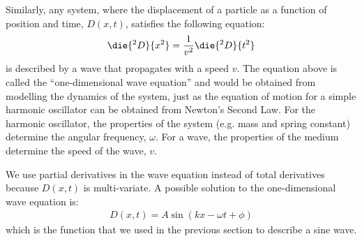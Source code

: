 Similarly, any system, where the displacement of a particle as a function of position and time, $D(x,t)$, satisfies the following equation:
\begin{align}
\die{^2D}{x^2}=\frac{1}{v^2}\die{^2D}{t^2}
\end{align}
is described by a wave that propagates with a speed $v$. The equation above is called the ``one-dimensional wave equation'' and would be obtained from modelling the dynamics of the system, just as the equation of motion for a simple harmonic oscillator can be obtained from Newton's Second Law. For the harmonic oscillator, the properties of the system (e.g. mass and spring constant) determine the angular frequency, $\omega$. For a wave, the properties of the medium determine the speed of the wave, $v$. 

We use partial derivatives in the wave equation instead of total derivatives because $D(x,t)$ is multi-variate. A possible solution to the one-dimensional wave equation is:
\begin{align*}
D(x,t) = A\sin\left( kx -\omega t + \phi \right)
\end{align*}
which is the function that we used in the previous section to describe a sine wave.

